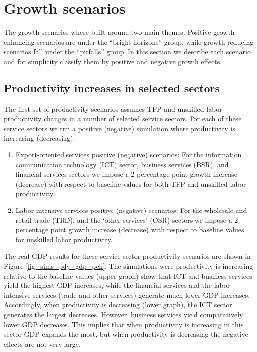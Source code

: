 \documentclass[11pt,english]{article}
\begin{document}

\section{Growth scenarios}

The growth scenarios where built around two main themes. Positive growth-enhancing scenarios are under the ``bright horizons'' group, while growth-reducing scenarios fall under the ``pitfalls'' group. In this section we describe each scenario and for simplicity classify them by positive and negative growth effects.

\subsection{Productivity increases in selected sectors}


The first set of productivity scenarios assumes TFP and unskilled labor productivity changes in a number of selected service sectors.  For each of these service sectors we run a positive (negative) simulation where productivity is increasing (decreasing): 
\begin{enumerate}
	\item Export-oriented services positive (negative) scenarios: For the information communication technology (ICT) sector, business services (BSR), and financial services sectors we impose a 2 percentage point growth increase (decrease) with respect to baseline values for both TFP and unskilled labor productivity
	\item Labor-intensive services positive (negative) scenarios: For the wholesale and retail trade (TRD), and the `other services' (OSR) sectors we impose a 2 percentage point growth increase (decrease) with respect to baseline values for unskilled labor productivity.
\end{enumerate}

The real GDP results for these service sector productivity scenarios are shown in Figure \ref{fig_sims_pdy_gdp_pch}. The simulations were productivity is increasing relative to the baseline values (upper graph) show that ICT and business services yield the highest GDP increases, while the financial services and the labor-intensive services (trade and other services) generate much lower GDP increases. Accordingly, when productivity is decreasing (lower graph), the ICT sector generates the largest decreases. However, business services yield comparatively lower GDP decreases. This implies that when productivity is increasing in this sector GDP expands the most, but when productivity is decreasing the negative effects are not very large. 
\end{document}
